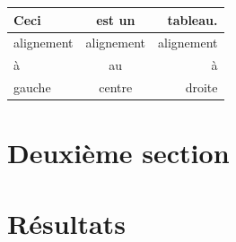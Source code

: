 \documentclass{article}
\begin{document}
\begin{tabular}{|l|c|r|}
    \hline
    Ceci       & est un     & tableau.   \\
    \hline
    \hline
    alignement & alignement & alignement \\
    \hline
    à          & au         & à          \\
    \hline
    gauche     & centre     & droite     \\
    \hline
\end{tabular}

\section{Deuxième section}


\section{Résultats}
\label{resultats}



\end{document}
